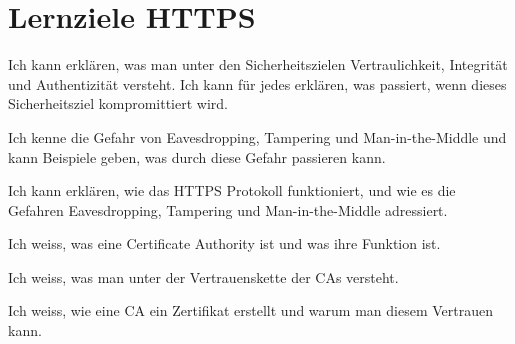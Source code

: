     \section{Lernziele HTTPS}
        \begin{todolist}
            \item Ich kann erklären, was man unter den Sicherheitszielen Vertraulichkeit, Integrität und Authentizität versteht. Ich kann für jedes erklären, was passiert, wenn dieses Sicherheitsziel kompromittiert wird. 
            \item Ich kenne die Gefahr von Eavesdropping, Tampering und Man-in-the-Middle und kann Beispiele geben, was durch diese Gefahr passieren kann. 
            \item Ich kann erklären, wie das HTTPS Protokoll funktioniert, und wie es die Gefahren Eavesdropping, Tampering und Man-in-the-Middle adressiert.
            \item Ich weiss, was eine Certificate Authority ist und was ihre Funktion ist.
            \item Ich weiss, was man unter der Vertrauenskette der CAs versteht.
            \item Ich weiss, wie eine CA ein Zertifikat erstellt und warum man diesem Vertrauen kann. 
        \end{todolist}